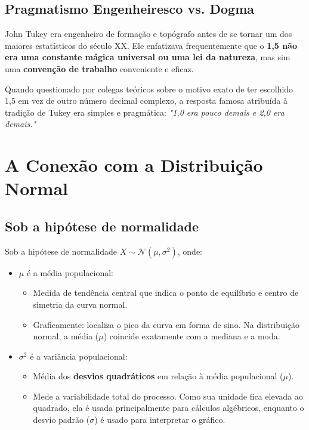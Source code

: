 \documentclass[12pt,a4paper]{article}
\begin{document}
\subsection{Pragmatismo Engenheiresco vs. Dogma}
John Tukey era engenheiro de formação e topógrafo antes de se tornar um dos maiores estatísticos do século XX. Ele enfatizava frequentemente que o \textbf{1,5 não era uma constante mágica universal ou uma lei da natureza}, mas sim uma \textbf{convenção de trabalho} conveniente e eficaz.

Quando questionado por colegas teóricos sobre o motivo exato de ter escolhido 1,5 em vez de outro número decimal complexo, a resposta famosa atribuída à tradição de Tukey era simples e pragmática: \textit{"1,0 era pouco demais e 2,0 era demais."}

\section{A Conexão com a Distribuição Normal}
\subsection{Sob a hipótese de normalidade}
Sob a hipótese de normalidade $X \sim \mathcal{N}(\mu, \sigma^2)$, onde:
\begin{itemize}
    \item $\mu$ é a média populacional:
    \begin{itemize}
        \item Medida de tendência central que indica o ponto de equilíbrio e centro de simetria da curva normal.
        \item Graficamente: localiza o pico da curva em forma de sino. Na distribuição normal, a média ($\mu$) coincide exatamente com a mediana e a moda.
    \end{itemize}
    \item $\sigma^2$ é a variância populacional:
    \begin{itemize}
        \item Média dos \textbf{desvios quadráticos} em relação à média populacional ($\mu$).
        \item Mede a variabilidade total do processo. Como sua unidade fica elevada ao quadrado, ela é usada principalmente para cálculos algébricos, enquanto o desvio padrão ($\sigma$) é usado para interpretar o gráfico.
    \end{itemize}
\end{itemize}
\end{document}
